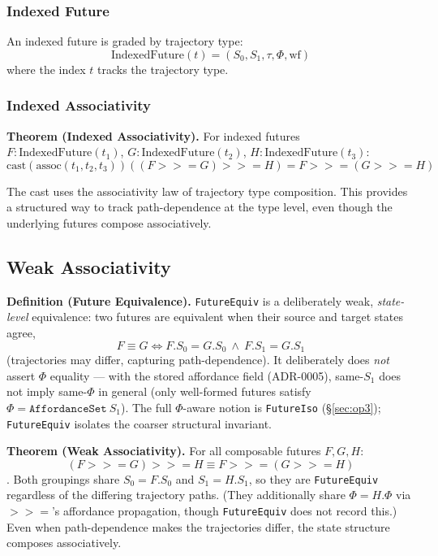\documentclass[11pt,a4paper]{article}
\newcommand{\seqBind}{\mathbin{>>=}}
\newcommand{\well}{\text{wf}}
\begin{document}
\subsubsection{Indexed Future}

An indexed future is graded by trajectory type:
\[
\text{IndexedFuture}(t) = (S_0, S_1, \tau, \Phi, \well)
\]
where the index $t$ tracks the trajectory type.

\subsubsection{Indexed Associativity}

\textbf{Theorem (Indexed Associativity).} For indexed futures $F : \text{IndexedFuture}(t_1)$, $G : \text{IndexedFuture}(t_2)$, $H : \text{IndexedFuture}(t_3)$:
\[
\text{cast}(\text{assoc}(t_1, t_2, t_3)) \left( (F \seqBind G) \seqBind H \right) = F \seqBind (G \seqBind H)
\]

The cast uses the associativity law of trajectory type composition. This provides a structured way to track path-dependence at the type level, even though the underlying futures compose associatively.

\subsection{Weak Associativity}

\textbf{Definition (Future Equivalence).} \texttt{FutureEquiv} is a
deliberately weak, \emph{state-level} equivalence: two futures are equivalent
when their source and target states agree,
\[
F \equiv G \iff F.S_0 = G.S_0 \ \land\ F.S_1 = G.S_1
\]
(trajectories may differ, capturing path-dependence). It deliberately does
\emph{not} assert $\Phi$ equality --- with the stored affordance field
(ADR-0005), same-$S_1$ does not imply same-$\Phi$ in general (only well-formed
futures satisfy $\Phi = \texttt{AffordanceSet}~S_1$). The full
$\Phi$-aware notion is \texttt{FutureIso} (\S\ref{sec:op3}); \texttt{FutureEquiv}
isolates the coarser structural invariant.

\textbf{Theorem (Weak Associativity).} For all composable futures $F, G, H$:
\[
(F \seqBind G) \seqBind H \equiv F \seqBind (G \seqBind H)
\]
. Both groupings share
$S_0 = F.S_0$ and $S_1 = H.S_1$, so they are \texttt{FutureEquiv} regardless of
the differing trajectory paths. (They additionally share $\Phi = H.\Phi$ via
$\seqBind$'s affordance propagation, though \texttt{FutureEquiv} does not
record this.) Even when path-dependence makes the trajectories differ, the
state structure composes associatively.
\end{document}
